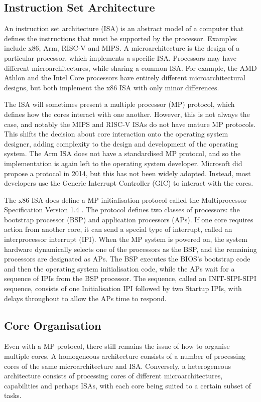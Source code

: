 \documentclass[bsc,frontabs,singlespacing,parskip,deptreport]{infthesis}
\begin{document}
\subsection{Instruction Set Architecture} \label{architectural-challenges}
An instruction set architecture (ISA) is an abstract model of a computer that defines the instructions that must be supported by the processor. Examples include x86, Arm, RISC-V and MIPS. A microarchitecture is the design of a particular processor, which implements a specific ISA. Processors may have different microarchitectures, while sharing a common ISA. For example, the AMD Athlon and the Intel Core processors have entirely different microarchitectural designs, but both implement the x86 ISA with only minor differences.

The ISA will sometimes present a multiple processor (MP) protocol, which defines how the cores interact with one another. However, this is not always the case, and notably the MIPS and RISC-V ISAs do not have mature MP protocols. This shifts the decision about core interaction onto the operating system designer, adding complexity to the design and development of the operating system. The Arm ISA does not have a standardised MP protocol, and so the implementation is again left to the operating system developer. Microsoft did propose a protocol in 2014, but this has not been widely adopted. Instead, most developers use the Generic Interrupt Controller (GIC) to interact with the cores.

The x86 ISA does define a MP initialisation protocol called the Multiprocessor Specification Version 1.4 \cite{intel-sys-prog-guide}. The protocol defines two classes of processors: the bootstrap processor (BSP) and application processors (APs). If one core requires action from another core, it can send a special type of interrupt, called an interprocessor interrupt (IPI). When the MP system is powered on, the system hardware dynamically selects one of the processors as the BSP, and the remaining processors are designated as APs. The BSP executes the BIOS’s bootstrap code and then the operating system initialisation code, while the APs wait for a sequence of IPIs from the BSP processor. The sequence, called an INIT-SIPI-SIPI sequence, consists of one Initialisation IPI followed by two Startup IPIs, with delays throughout to allow the APs time to respond.

\subsection{Core Organisation}
Even with a MP protocol, there still remains the issue of how to organise multiple cores. A homogeneous architecture consists of a number of processing cores of the same microarchitecture and ISA. Conversely, a heterogeneous architecture consists of processing cores of different microarchitectures, capabilities and perhaps ISAs, with each core being suited to a certain subset of tasks.
\end{document}
